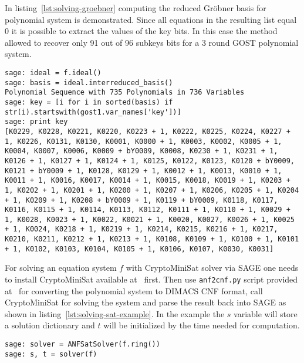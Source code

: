 In listing~\ref{lst:solving-groebner} computing the reduced
Gr\"obner basis for polynomial system is demonstrated. Since all equations in the resulting list
equal 0 it is possible to extract the values of the key bits. In this case the
method allowed to recover only 91 out of 96 subkeys bits for a 3 round GOST
polynomial system.
\begin{lstlisting}[label=lst:solving-groebner, caption=Solving equation system using reduced Gr\"obner basis]
sage: ideal = f.ideal()
sage: basis = ideal.interreduced_basis()
Polynomial Sequence with 735 Polynomials in 736 Variables
sage: key = [i for i in sorted(basis) if str(i).startswith(gost1.var_names['key'])]
sage: print key
[K0229, K0228, K0221, K0220, K0223 + 1, K0222, K0225, K0224, K0227 + 1, K0226, K0131, K0130, K0001, K0000 + 1, K0003, K0002, K0005 + 1, K0004, K0007, K0006, K0009 + bY0009, K0008, K0230 + 1, K0231 + 1, K0126 + 1, K0127 + 1, K0124 + 1, K0125, K0122, K0123, K0120 + bY0009, K0121 + bY0009 + 1, K0128, K0129 + 1, K0012 + 1, K0013, K0010 + 1, K0011 + 1, K0016, K0017, K0014 + 1, K0015, K0018, K0019 + 1, K0203 + 1, K0202 + 1, K0201 + 1, K0200 + 1, K0207 + 1, K0206, K0205 + 1, K0204 + 1, K0209 + 1, K0208 + bY0009 + 1, K0119 + bY0009, K0118, K0117, K0116, K0115 + 1, K0114, K0113, K0112, K0111 + 1, K0110 + 1, K0029 + 1, K0028, K0023 + 1, K0022, K0021 + 1, K0020, K0027, K0026 + 1, K0025 + 1, K0024, K0218 + 1, K0219 + 1, K0214, K0215, K0216 + 1, K0217, K0210, K0211, K0212 + 1, K0213 + 1, K0108, K0109 + 1, K0100 + 1, K0101 + 1, K0102, K0103, K0104, K0105 + 1, K0106, K0107, K0030, K0031]
\end{lstlisting}

For solving an equation system $f$ with CryptoMiniSat solver via SAGE one needs to
install CryptoMiniSat available at~\cite{soos:cryptominisat} first. Then use
\verb+anf2cnf.py+ script provided at~\cite{anf2cnf} for converting the polynomial
system to DIMACS CNF format, call CryptoMiniSat for solving the system and
parse the result back into SAGE as shown in
listing~\ref{lst:solving-sat-example}. In the example the $s$ variable will
store a solution dictionary and $t$ will be initialized by the time needed for
computation.
\begin{lstlisting}[label=lst:solving-sat-example, caption=Solving equation system using SAT solver]
sage: solver = ANFSatSolver(f.ring())
sage: s, t = solver(f)
\end{lstlisting}

